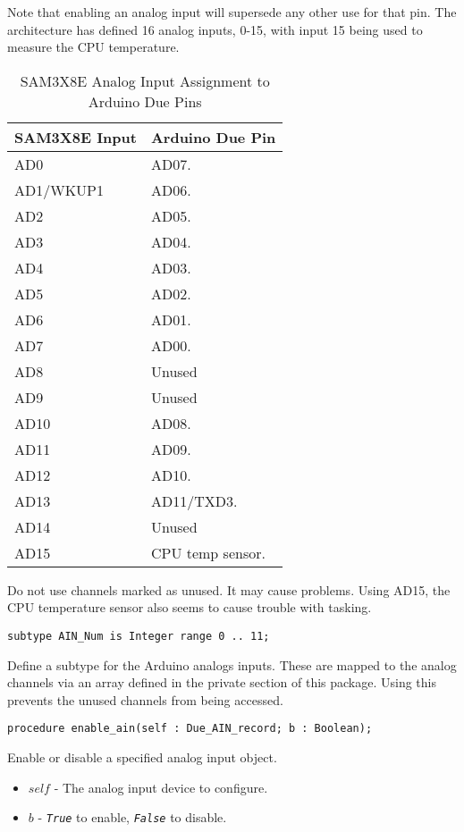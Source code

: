 \documentclass[10pt, openany]{book}
\newcommand{\indextype}[1]{\index[type]{#1}}
\newcommand{\indexfunc}[1]{\index[func]{#1}}
\newcommand{\constant}[1]{\emph{\texttt{#1}}}
\begin{document}
Note that enabling an analog input will supersede any other use for that pin.  The architecture has defined 16 analog inputs, 0-15, with input 15 being used to measure the CPU temperature.

\begin{table}[!h]
\begin{center}
  \begin{tabular}{l|l}
    SAM3X8E Input & Arduino Due Pin \\
    \hline
    AD0 & AD07. \\
    AD1/WKUP1 & AD06. \\
    AD2 & AD05. \\
    AD3 & AD04. \\
    AD4 & AD03. \\
    AD5 & AD02. \\
    AD6 & AD01. \\
    AD7 & AD00. \\
    AD8 & Unused \\
    AD9 & Unused \\
    AD10 & AD08. \\
    AD11 & AD09. \\
    AD12 & AD10. \\
    AD13 & AD11/TXD3. \\
    AD14 & Unused \\
    AD15 & CPU temp sensor. \\
  \end{tabular}
  \caption{SAM3X8E Analog Input Assignment to Arduino Due Pins}
  \label{tbl:ArduinoDueAIN}
\end{center}
\end{table}

Do not use channels marked as unused.  It may cause problems.  Using AD15, the CPU temperature sensor also seems to cause trouble with tasking.

\begin{lstlisting}
subtype AIN_Num is Integer range 0 .. 11;
\end{lstlisting}
\indextype{AIN\_Num}
Define a subtype for the Arduino analogs inputs.  These are mapped to the analog channels via an array defined in the private section of this package.  Using this prevents the unused channels from being accessed.

\begin{lstlisting}
procedure enable_ain(self : Due_AIN_record; b : Boolean);
\end{lstlisting}
\indexfunc{enable\_ain}
Enable or disable a specified analog input object.
\begin{itemize}
  \item $self$ - The analog input device to configure.
  \item $b$ - \constant{True} to enable, \constant{False} to disable.
\end{itemize}
\end{document}
